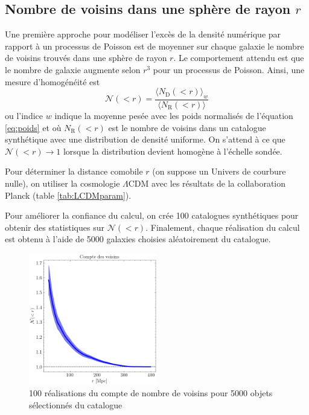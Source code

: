 \documentclass{article}
\numberwithin{equation}{section}
\begin{document}
\subsection{Nombre de voisins dans une sphère de rayon $r$}
Une première approche pour modéliser l'excès de la densité numérique par rapport à 
un processus de Poisson est de moyenner sur chaque galaxie 
le nombre de voisins trouvés dans une 
sphère de rayon $r$. Le comportement attendu est que le nombre de galaxie augmente selon 
$r^3$ pour un processus de Poisson. Ainsi, une mesure d'homogénéité est 
\[
        \mathcal{N}(< r) = \frac{\langle N_{\text{D}}(<r)\rangle_w}{
        \langle N_{\text{R}}(<r)\rangle}
\]
ou l'indice $w$ indique la moyenne pesée avec les poids normalisés de l'équation 
\eqref{eq:poids} et 
où $N_{\text{R}}(<r)$ est le nombre de voisins dans un catalogue synthétique 
avec une distribution de densité uniforme. On s'attend à ce que 
$\mathcal{N}(<r) \rightarrow 1$ lorsque la distribution 
devient homogène à l'échelle sondée.

Pour déterminer la distance comobile $r$ (on suppose un Univers de courbure nulle), on utiliser 
la cosmologie $\Lambda \text{CDM}$ avec les résultats de la collaboration Planck (table \ref{tab:LCDMparam}).


Pour améliorer la confiance du calcul, on crée 100 catalogues synthétiques pour obtenir 
des statistiques sur $\mathcal{N}(<r)$. Finalement, chaque réalisation du calcul est obtenu 
à l'aide de 5000 galaxies choisies aléatoirement du catalogue.

\begin{figure}[H]
        \centering
        \includegraphics[width=0.5\textwidth]{coorelation_count-in-sphere}
        \caption{100 réalisations du compte de nombre de voisins pour 5000 objets 
        sélectionnés du catalogue}
        \label{fig:CountInSphere}
\end{figure}
\end{document}
